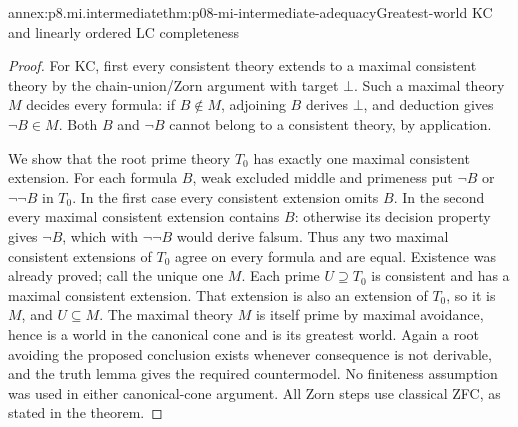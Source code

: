 \begin{annexitem}{annex:p8.mi.intermediate}{thm:p08-mi-intermediate-adequacy}{Greatest-world KC and linearly ordered LC completeness}
\begin{proof}
For KC, first every consistent theory extends to a maximal consistent
theory by the chain-union/Zorn argument with target \(\bot\).
Such a maximal theory \(M\) decides every formula: if \(B\notin M\),
adjoining \(B\) derives \(\bot\), and deduction gives
\(\neg B\in M\). Both \(B\) and \(\neg B\) cannot belong
to a consistent theory, by application.

We show that the root prime theory \(T_0\) has exactly one maximal
consistent extension. For each formula \(B\), weak excluded middle
and primeness put \(\neg B\) or \(\neg\neg B\) in \(T_0\).
In the first case every consistent extension omits \(B\). In the
second every maximal consistent extension contains \(B\): otherwise
its decision property gives \(\neg B\), which with \(\neg\neg B\)
would derive falsum. Thus any two maximal consistent extensions of
\(T_0\) agree on every formula and are equal. Existence was already
proved; call the unique one \(M\).
Each prime \(U\supseteq T_0\) is consistent and has a maximal
consistent extension. That extension is also an extension of \(T_0\),
so it is \(M\), and \(U\subseteq M\). The maximal theory \(M\)
is itself prime by maximal avoidance, hence is a world in the canonical
cone and is its greatest world. Again a root avoiding the proposed
conclusion exists whenever consequence is not derivable, and the truth
lemma gives the required countermodel. No finiteness assumption was
used in either canonical-cone argument. All Zorn steps use classical
ZFC, as stated in the theorem.
\end{proof}
\end{annexitem}

